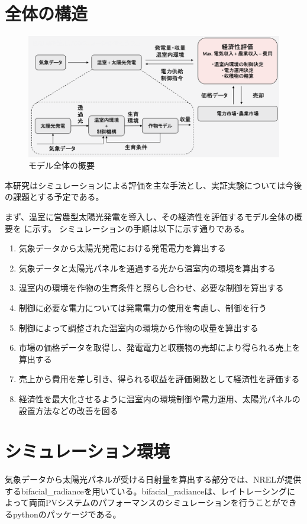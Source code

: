 \documentclass[uplatex,dvipdfmx,nomag,a4paper,oneside,onecolumn,12pt]{bxjsreport} %
\begin{document}
\section{全体の構造}

\begin{figure}[ht]
    \centering
    \includegraphics[width=0.9\linewidth]{fig/wholeSystem.png}
    \caption{モデル全体の概要}
    \label{fig:wholeSystem}
\end{figure}

本研究はシミュレーションによる評価を主な手法とし、実証実験については今後の課題とする予定である。

まず、温室に営農型太陽光発電を導入し、その経済性を評価するモデル全体の概要を  に示す。
シミュレーションの手順は以下に示す通りである。

\begin{enumerate}
    \item 気象データから太陽光発電における発電電力を算出する
    \item 気象データと太陽光パネルを通過する光から温室内の環境を算出する
    \item 温室内の環境を作物の生育条件と照らし合わせ、必要な制御を算出する
    \item 制御に必要な電力については発電電力の使用を考慮し、制御を行う
    \item 制御によって調整された温室内の環境から作物の収量を算出する
    \item 市場の価格データを取得し、発電電力と収穫物の売却により得られる売上を算出する
    \item 売上から費用を差し引き、得られる収益を評価関数として経済性を評価する
    \item 経済性を最大化させるように温室内の環境制御や電力運用、太陽光パネルの設置方法などの改善を図る
\end{enumerate}

\section{シミュレーション環境}
気象データから太陽光パネルが受ける日射量を算出する部分では、NRELが提供するbifacial\_radianceを用いている。bifacial\_radianceは、レイトレーシングによって両面PVシステムのパフォーマンスのシミュレーションを行うことができるpythonのパッケージである\cite{Bifacialradiance}。
\end{document}
